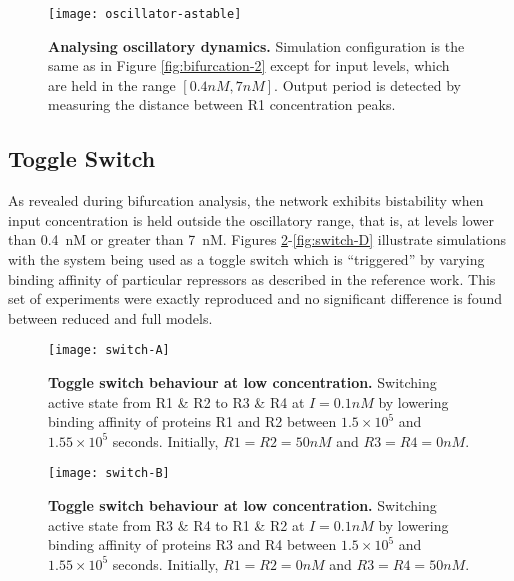     \begin{figure}[!htb]
      \centering
      \texttt{[image: oscillator-astable]}
      \caption{\textbf{Analysing oscillatory dynamics.} Simulation configuration is the same as in Figure \ref{fig:bifurcation-2} except for input levels, which are held in the range $[0.4 nM, 7 nM]$. Output period is detected by measuring the distance between R1 concentration peaks.}
      \label{fig:oscillator-astable}
    \end{figure}


  \subsection{Toggle Switch}

    As revealed during bifurcation analysis, the network exhibits bistability when input concentration is held outside the oscillatory range, that is, at levels lower than \SI{0.4}{\nano M} or greater than \SI{7}{\nano M}.
    Figures \ref{fig:switch-A}-\ref{fig:switch-D} illustrate simulations with the system being used as a toggle switch which is ``triggered'' by varying binding affinity of particular repressors as described in the reference work.
    This set of experiments were exactly reproduced and no significant difference is found between reduced and full models. %


    \begin{figure}[!htb]
      \centering
      \texttt{[image: switch-A]}
      \caption{\textbf{Toggle switch behaviour at low concentration.} Switching active state from R1 \& R2 to R3 \& R4 at $I = 0.1 nM$ by lowering binding affinity of proteins R1 and R2 between $1.5 \times 10^5$ and $1.55 \times 10^5$ seconds. Initially, $R1 = R2 = 50nM$ and $R3 = R4 = 0nM$.}
      \label{fig:switch-A}
    \end{figure}
    \begin{figure}[!htb]
      \centering
      \texttt{[image: switch-B]}
      \caption{\textbf{Toggle switch behaviour at low concentration.} Switching active state from R3 \& R4 to R1 \& R2 at $I = 0.1 nM$ by lowering binding affinity of proteins R3 and R4 between $1.5 \times 10^5$ and $1.55 \times 10^5$ seconds. Initially, $R1 = R2 = 0nM$ and $R3 = R4 = 50nM$.}
      \label{fig:switch-B}
    \end{figure}

